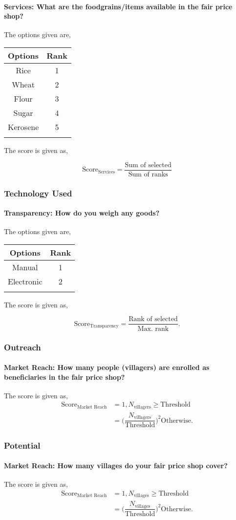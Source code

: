 \documentclass[oneside,twocolumn]{article}
\newcommand{\tsub}[2]{\text{#1}_{\text{#2}}}
\newcommand{\tsubb}[2]{#1_{\text{#2}}}
\newcommand{\dsub}[2]{\dfrac{\text{#1}}{\text{#2}}}
\newcommand{\multsel}[1]
{
	\[
		\tsub{Score}{#1} = \dsub{Sum of selected}{Sum of ranks}
	\]
}
\newcommand{\singsel}[1]
{
	\[
		\tsub{Score}{#1} = \dsub{Rank of selected}{Max. rank}.
	\]
}
\newenvironment{ttable}
{
\begin{center}
\begin{tabular}{c|c}
\hline
}
{
\\ \hline
\end{tabular}
\end{center}
}
\begin{document}
\paragraph{Services: What are the foodgrains/items available in the fair price shop?}

The options given are,
\begin{ttable}
Options & Rank \\ \hline
Rice & 1 \\
Wheat & 2 \\
Flour & 3 \\
Sugar & 4 \\
Kerosene & 5 \\
\hline
\end{ttable}
The score is given as,
\multsel{Services}
\subsubsection{Technology Used}

\paragraph{Transparency: How do you weigh any goods?}

The options given are,
\begin{ttable}
Options & Rank \\ \hline
Manual & 1 \\
Electronic & 2 \\
\hline
\end{ttable}
The score is given as,
\singsel{Transparency}
\subsubsection{Outreach}

\paragraph{Market Reach: How many people (villagers) are enrolled as beneficiaries in the fair price shop?}

The score is given as,
\begin{align*}
\tsub{Score}{Market Reach} &= 1, \tsubb{N}{villagers} \ge \text{Threshold} \\
        &=
\Big(\dfrac{\tsubb{N}{villagers}}{\text{Threshold}}\Big)^{2}
\text{Otherwise}.
\end{align*}
\subsubsection{Potential}

\paragraph{Market Reach: How many villages do your fair price shop cover?}

The score is given as,
\begin{align*}
\tsub{Score}{Market Reach} &= 1, \tsubb{N}{villages} \ge \text{Threshold} \\
        &=
\Big(\dfrac{\tsubb{N}{villages}}{\text{Threshold}}\Big)^{2}
\text{Otherwise}.
\end{align*}
\end{document}
